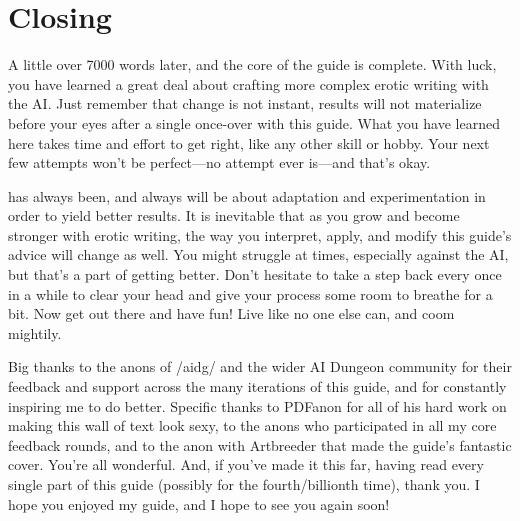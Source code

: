 ﻿\documentclass[Coomer-main.tex]{subfiles}
\begin{document}
\chapter{Closing}

A little over 7000 words later, and the core of the guide is complete. With luck, you have learned a great deal about crafting more complex erotic writing with the AI. Just remember that change is not instant, results will not materialize before your eyes after a single once-over with this guide. What you have learned here takes time and effort to get right, like any other skill or hobby. Your next few attempts won't be perfect—no attempt ever is—and that's okay.

\aid has always been, and always will be about adaptation and experimentation in order to yield better results. It is inevitable that as you grow and become stronger with erotic writing, the way you interpret, apply, and modify this guide's advice will change as well. You might struggle at times, especially against the AI, but that's a part of getting better. Don't hesitate to take a step back every once in a while to clear your head and give your process some room to breathe for a bit. Now get out there and have fun! Live like no one else can, and coom mightily.

Big thanks to the anons of /aidg/ and the wider AI Dungeon community for their feedback and support across the many iterations of this guide, and for constantly inspiring me to do better. Specific thanks to PDFanon for all of his hard work on making this wall of text look sexy, to the anons who participated in all my core feedback rounds, and to the anon with Artbreeder that made the guide’s fantastic cover. You're all wonderful. And, if you've made it this far, having read every single part of this guide (possibly for the fourth/billionth time), thank you. I hope you enjoyed my guide, and I hope to see you again soon!
\end{document}

